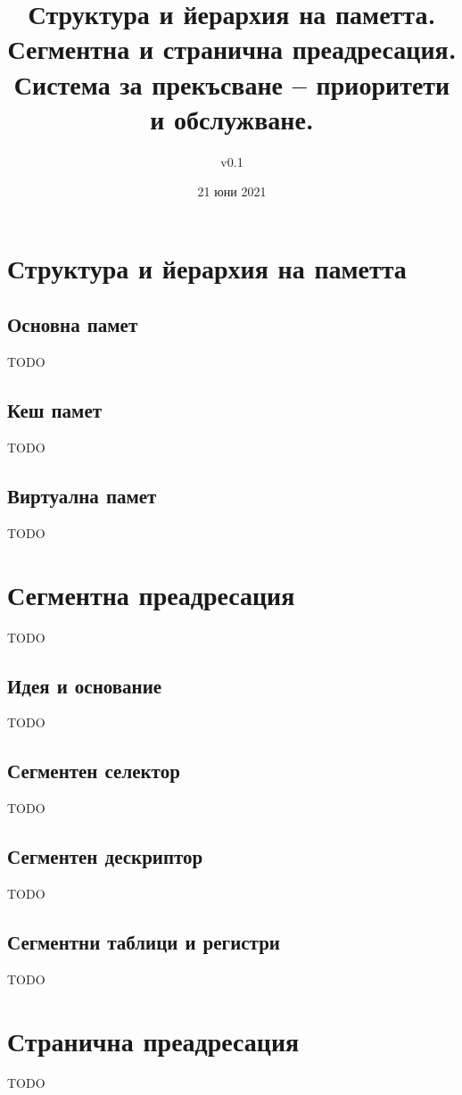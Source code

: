 \documentclass[fleqn,12pt]{article}
\title{Структура и йерархия на паметта. Сегментна и странична преадресация.
Система за прекъсване – приоритети и обслужване.}
\author{v0.1}
\date{21 юни 2021}
\begin{document}
\maketitle

\tableofcontents

\section{Структура и йерархия на паметта}

\subsection{Основна памет}
TODO

\subsection{Кеш памет}
TODO

\subsection{Виртуална памет}
TODO

\section{Сегментна преадресация}
TODO

\subsection{Идея и основание}
TODO

\subsection{Сегментен селектор}
TODO

\subsection{Сегментен дескриптор}
TODO

\subsection{Сегментни таблици и регистри}
TODO

\section{Странична преадресация}
TODO
\end{document}
